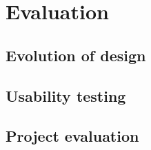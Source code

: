 \chapter{Evaluation}\label{chap:evaluation}

\section{Evolution of design}


\section{Usability testing}

\section{Project evaluation}

